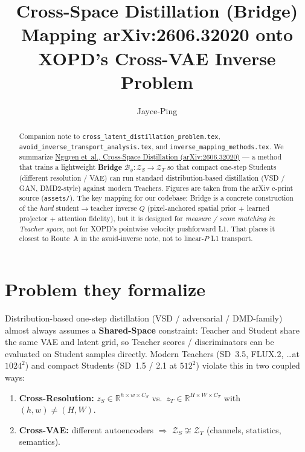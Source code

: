 \documentclass[11pt,a4paper]{article}
\title{\textbf{Cross-Space Distillation (Bridge)}\\[0.3em]
\large Mapping arXiv:2606.32020 onto XOPD's Cross-VAE Inverse Problem}
\author{Jayce-Ping}
\date{}
\newcommand{\R}{\mathbb{R}}
\newcommand{\Za}{\mathcal{Z}_{T}}
\newcommand{\Zb}{\mathcal{Z}_{S}}
\newcommand{\Bridge}{\mathcal{B}}
\theoremstyle{definition}
\begin{document}
\maketitle

\begin{abstract}
Companion note to \texttt{cross\_latent\_distillation\_problem.tex},
\texttt{avoid\_inverse\_transport\_analysis.tex}, and
\texttt{inverse\_mapping\_methods.tex}.
We summarize
\href{https://arxiv.org/abs/2606.32020}{Nguyen et~al., Cross-Space Distillation
(arXiv:2606.32020)} --- a method that trains a lightweight
\textbf{Bridge} $\Bridge_\phi:\Zb\to\Za$ so that compact one-step Students
(different resolution / VAE) can run standard distribution-based distillation
(VSD / GAN, DMD2-style) against modern Teachers.
Figures are taken from the arXiv e-print source (\texttt{assets/}).
The key mapping for our codebase: Bridge is a concrete construction of the
\emph{hard} student$\to$teacher inverse $Q$ (pixel-anchored spatial prior $+$
learned projector $+$ attention fidelity), but it is designed for
\emph{measure / score matching in Teacher space}, not for XOPD's pointwise
velocity pushforward L1. That places it closest to Route~A in the avoid-inverse
note, not to linear-$P$ L1 transport.
\end{abstract}

\section{Problem they formalize}
\label{sec:problem}

Distribution-based one-step distillation (VSD / adversarial / DMD-family) almost always
assumes a \textbf{Shared-Space} constraint: Teacher and Student share the same VAE and
latent grid, so Teacher scores / discriminators can be evaluated on Student samples
directly. Modern Teachers (SD~3.5, FLUX.2, \ldots at $1024^2$) and compact Students
(SD~1.5 / 2.1 at $512^2$) violate this in two coupled ways:

\begin{enumerate}[leftmargin=1.6em,itemsep=2pt]
  \item \textbf{Cross-Resolution:} $z_S\in\R^{h\times w\times C_S}$ vs.\
        $z_T\in\R^{H\times W\times C_T}$ with $(h,w)\neq(H,W)$.
  \item \textbf{Cross-VAE:} different autoencoders $\Rightarrow$
        $\Zb\not\cong\Za$ (channels, statistics, semantics).
\end{enumerate}
\end{document}
